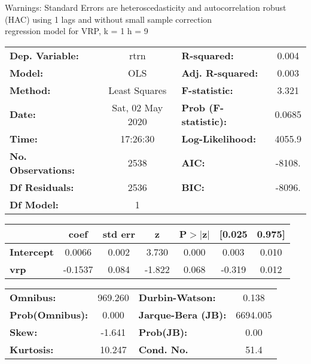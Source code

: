 Warnings: \newline
 [1] Standard Errors are heteroscedasticity and autocorrelation robust (HAC) using 1 lags and without small sample correction\\ 

regression model for VRP, k = 1 h = 9\begin{center}
\begin{tabular}{lclc}
\toprule
\textbf{Dep. Variable:}    &       rtrn       & \textbf{  R-squared:         } &     0.004   \\
\textbf{Model:}            &       OLS        & \textbf{  Adj. R-squared:    } &     0.003   \\
\textbf{Method:}           &  Least Squares   & \textbf{  F-statistic:       } &     3.321   \\
\textbf{Date:}             & Sat, 02 May 2020 & \textbf{  Prob (F-statistic):} &   0.0685    \\
\textbf{Time:}             &     17:26:30     & \textbf{  Log-Likelihood:    } &    4055.9   \\
\textbf{No. Observations:} &        2538      & \textbf{  AIC:               } &    -8108.   \\
\textbf{Df Residuals:}     &        2536      & \textbf{  BIC:               } &    -8096.   \\
\textbf{Df Model:}         &           1      & \textbf{                     } &             \\
\bottomrule
\end{tabular}
\begin{tabular}{lcccccc}
                   & \textbf{coef} & \textbf{std err} & \textbf{z} & \textbf{P$> |$z$|$} & \textbf{[0.025} & \textbf{0.975]}  \\
\midrule
\textbf{Intercept} &       0.0066  &        0.002     &     3.730  &         0.000        &        0.003    &        0.010     \\
\textbf{vrp}       &      -0.1537  &        0.084     &    -1.822  &         0.068        &       -0.319    &        0.012     \\
\bottomrule
\end{tabular}
\begin{tabular}{lclc}
\textbf{Omnibus:}       & 969.260 & \textbf{  Durbin-Watson:     } &    0.138  \\
\textbf{Prob(Omnibus):} &   0.000 & \textbf{  Jarque-Bera (JB):  } & 6694.005  \\
\textbf{Skew:}          &  -1.641 & \textbf{  Prob(JB):          } &     0.00  \\
\textbf{Kurtosis:}      &  10.247 & \textbf{  Cond. No.          } &     51.4  \\
\bottomrule
\end{tabular}
\end{center}

